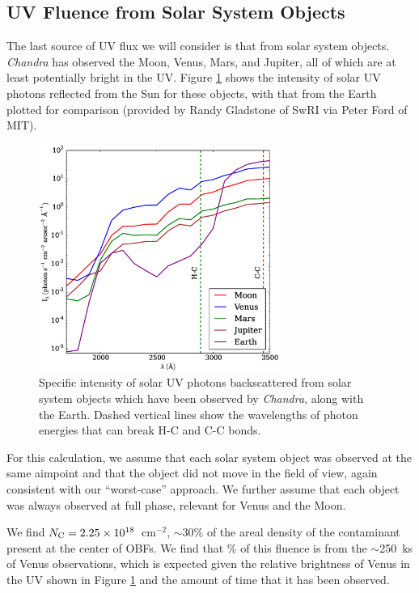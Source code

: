 \documentclass[11pt]{article}
\begin{document}
\subsection{UV Fluence from Solar System Objects}\label{sec:ssobj}

The last source of UV flux we will consider is that from solar system objects. {\it Chandra} has observed the
Moon, Venus, Mars, and Jupiter, all of which are at least potentially bright in the UV. Figure \ref{fig:ss_obj_intensity} shows the intensity of solar UV photons reflected from the Sun for these objects, with that from the Earth plotted for comparison (provided by Randy Gladstone of SwRI via Peter Ford of MIT).

\begin{figure}
\begin{center}
\includegraphics[width=0.7\textwidth]{ss_obj_intensity.eps}
\caption{Specific intensity of solar UV photons backscattered from solar system objects which have been observed by {\it Chandra}, along with the Earth. Dashed vertical lines show the wavelengths of photon energies that can break H-C and C-C bonds.\label{fig:ss_obj_intensity}}
\end{center}
\end{figure}

For this calculation, we assume that each solar system object was observed at the same aimpoint and that the object did not move in the field of view, again consistent with our ``worst-case'' approach. We further assume that each object was always observed at full phase, relevant for Venus and the Moon.

We find $N_{\rm C} = 2.25 \times 10^{18}$~cm$^{-2}$, $\sim$30\% of the areal density of the contaminant present at the center of OBFs. We find that \% of this fluence is from the $\sim$250~ks of Venus observations, which is expected given the relative brightness of Venus in the UV shown in Figure \ref{fig:ss_obj_intensity} and the amount of time that it has been observed.
\end{document}
